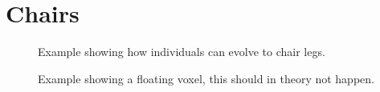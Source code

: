 \section{Chairs}
\begin{figure}[h]
\centering
{}
\hfil
{}
\caption{Example showing how individuals can evolve to chair legs.}
\label{fig:chair:legs}
\end{figure}

\begin{figure}[h]
\centering
{}
\caption{Example showing a floating voxel, this should in theory not happen.}
\label{fig:chair:floatvox}
\end{figure}

